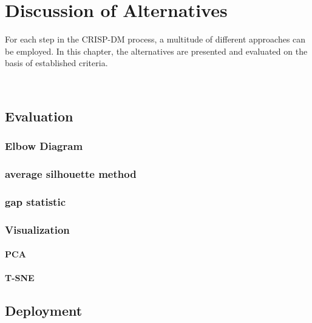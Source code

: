 \chapter{Discussion of Alternatives}
For each step in the \ac{CRISP-DM} process, a multitude of different approaches can be employed. In this chapter, the alternatives are presented and evaluated on the basis of established criteria.

	
		
\
\section{Evaluation}
	\subsection{Elbow Diagram}
	\subsection{average silhouette method}
	\subsection{gap statistic}
	\subsection{Visualization}
		\subsubsection{PCA}
		\subsubsection{T-SNE}
\section{Deployment}
